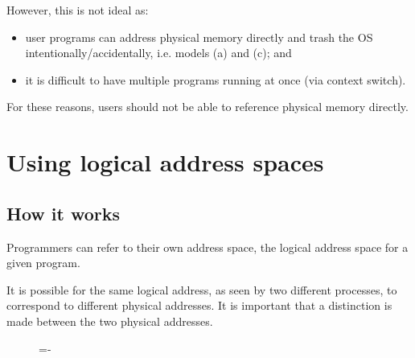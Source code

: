 \documentclass[a4paper]{systems-software}
\begin{document}
However, this is not ideal as:
\begin{itemize}
	\item user programs can address physical memory directly and trash the OS intentionally/accidentally, i.e. models (a) and (c); and
	\item it is difficult to have multiple programs running at once (via context switch).
\end{itemize}

For these reasons, users should not be able to reference physical memory directly.


\section*{Using logical address spaces}

\subsection*{How it works}

Programmers can refer to their own address space, the logical address space for a given program.

It is possible for the same logical address, as seen by two different processes, to correspond to different physical addresses. It is important that a distinction is made between the two physical addresses.

\begin{figure}[H]
  \lineskip=-\fboxrule
\end{figure}
\end{document}
